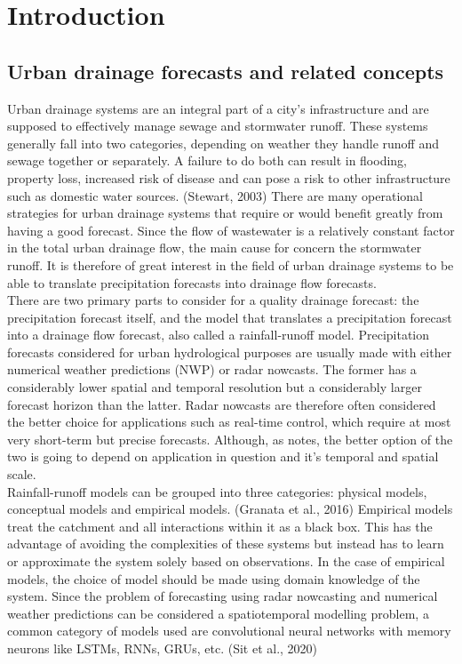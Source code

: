 \chapter{Introduction}

\section{Urban drainage forecasts and related concepts}
Urban drainage systems are an integral part of a city’s infrastructure and are supposed to effectively manage sewage and stormwater runoff. These systems generally fall into two categories, depending on weather they handle runoff and sewage together or separately. A failure to do both can result in flooding, property loss, increased risk of disease and can pose a risk to other infrastructure such as domestic water sources. (Stewart, 2003) There are many operational strategies for urban drainage systems that require or would benefit greatly from having a good forecast. \cite{ThorndahlRadar} Since the flow of wastewater is a relatively constant factor in the total urban drainage flow, the main cause for concern the stormwater runoff. It is therefore of great interest in the field of urban drainage systems to be able to translate precipitation forecasts into drainage flow forecasts.\\
There are two primary parts to consider for a quality drainage forecast: the precipitation forecast itself, and the model that translates a precipitation forecast into a drainage flow forecast, also called a rainfall-runoff model. Precipitation forecasts considered for urban hydrological purposes are usually made with either numerical weather predictions (NWP) or radar nowcasts. The former has a considerably lower spatial and temporal resolution but a considerably larger forecast horizon than the latter. Radar nowcasts are therefore often considered the better choice for applications such as real-time control, which require at most very short-term but precise forecasts. Although, as \cite{jonasphd} notes, the better option of the two is going to depend on application in question and it’s temporal and spatial scale. \\
Rainfall-runoff models can be grouped into three categories: physical models, conceptual models and empirical models. (Granata et al., 2016) Empirical models treat the catchment and all interactions within it as a black box. This has the advantage of avoiding the complexities of these systems but instead has to learn or approximate the system solely based on observations. In the case of empirical models, the choice of model should be made using domain knowledge of the system. Since the problem of forecasting using radar nowcasting and numerical weather predictions can be considered a spatiotemporal modelling problem, a common category of models used are convolutional neural networks with memory neurons like LSTMs, RNNs, GRUs, etc. (Sit et al., 2020) \\
